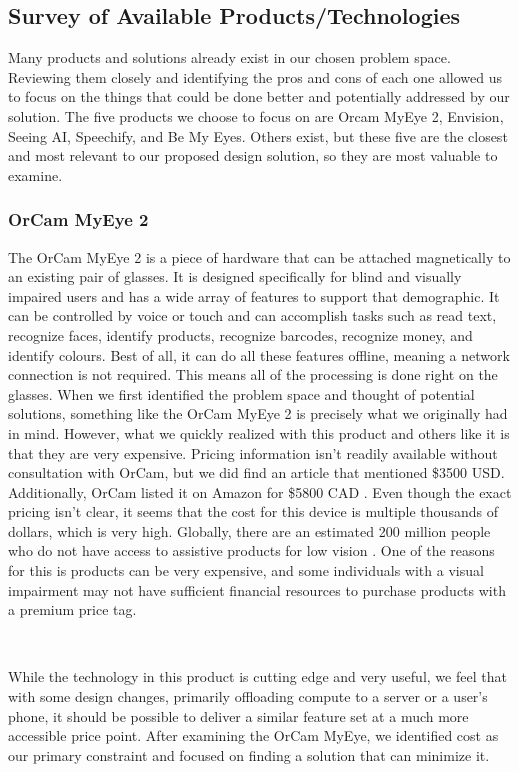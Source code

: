 \documentclass[a4paper,11pt]{article}
\begin{document}
\subsection{Survey of Available Products/Technologies}
Many products and solutions already exist in our chosen problem space. Reviewing them closely and identifying the pros and cons of each one allowed us to focus on the things that could be done better and potentially addressed by our solution. The five products we choose to focus on are Orcam MyEye 2, Envision, Seeing AI, Speechify, and Be My Eyes. Others exist, but these five are the closest and most relevant to our proposed design solution, so they are most valuable to examine.

\subsubsection{OrCam MyEye 2}
The OrCam MyEye 2 \cite{orcam} is a piece of hardware that can be attached magnetically to an existing pair of glasses. It is designed specifically for blind and visually impaired users and has a wide array of features to support that demographic. It can be controlled by voice or touch and can accomplish tasks such as read text, recognize faces, identify products, recognize barcodes, recognize money, and identify colours. Best of all, it can do all these features offline, meaning a network connection is not required. This means all of the processing is done right on the glasses. When we first identified the problem space and thought of potential solutions, something like the OrCam MyEye 2 is precisely what we originally had in mind. However, what we quickly realized with this product and others like it is that they are very expensive. Pricing information isn't readily available without consultation with OrCam, but we did find an article \cite{orcam-price} that mentioned \$3500 USD. Additionally, OrCam listed it on Amazon for \$5800 CAD \cite{orcam-amazon}. Even though the exact pricing isn't clear, it seems that the cost for this device is multiple thousands of dollars, which is very high. Globally, there are an estimated 200 million people who do not have access to assistive products for low vision \cite{WHO-assistive}. One of the reasons for this is products can be very expensive, and some individuals with a visual impairment may not have sufficient financial resources to purchase products with a premium price tag.

\

\noindent
While the technology in this product is cutting edge and very useful, we feel that with some design changes, primarily offloading compute to a server or a user's phone, it should be possible to deliver a similar feature set at a much more accessible price point. After examining the OrCam MyEye, we identified cost as our primary constraint and focused on finding a solution that can minimize it.
\end{document}
